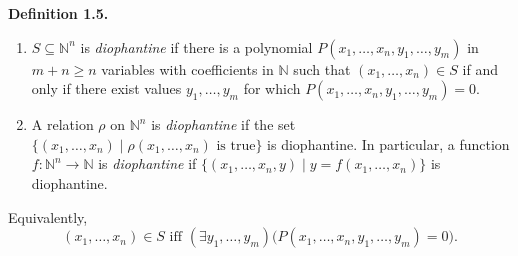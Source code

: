 \textbf{Definition 1.5.}
\begin{enumerate}
  \item[(i)] $S \subseteq \mathbb{N}^n$ is \textit{diophantine} if there is a polynomial $P(x_1, \ldots, x_n, y_1, \ldots, y_m)$ in $m + n \geq n$ variables with coefficients in $\mathbb{N}$ such that $(x_1, \ldots, x_n) \in S$ if and only if there exist values $y_1, \ldots, y_m$ for which $P(x_1, \ldots, x_n, y_1, \ldots, y_m) = 0$.

  \item[(ii)] A relation $\rho$ on $\mathbb{N}^n$ is \textit{diophantine} if the set $\{(x_1, \ldots, x_n) \mid \rho(x_1, \ldots, x_n) \text{ is true}\}$ is diophantine. In particular, a function $f: \mathbb{N}^n \to \mathbb{N}$ is \textit{diophantine} if $\{(x_1, \ldots, x_n, y) \mid y = f(x_1, \ldots, x_n)\}$ is diophantine.
\end{enumerate}

Equivalently,
$$
(x_1, \ldots, x_n) \in S \text{ iff } (\exists y_1, \ldots, y_m)\bigl(P(x_1, \ldots, x_n, y_1, \ldots, y_m) = 0\bigr).
$$

